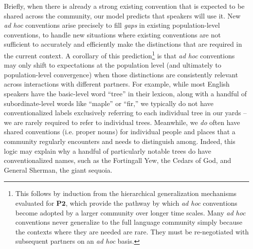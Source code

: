 Briefly, when there is already a strong existing convention that is expected to be shared across the community, our model predicts that speakers will use it. 
New \emph{ad hoc} conventions arise precisely to fill \emph{gaps} in existing population-level conventions, to handle new situations where existing conventions are not sufficient to accurately and efficiently make the distinctions that are required in the current context. 
A corollary of this prediction\footnote{This follows by induction from the hierarchical generalization mechanisms evaluated for $\textbf{P2}$, which provide the pathway by which \emph{ad hoc} conventions become adopted by a larger community over longer time scales. Many \emph{ad hoc} conventions never generalize to the full language community simply because the contexts where they are needed are rare. They must be re-negotiated with subsequent partners on an \emph{ad hoc} basis.} is that \emph{ad hoc} conventions may only shift to expectations at the population level (and ultimately to population-level convergence) when those distinctions are consistently relevant across interactions with different partners.
For example, while most English speakers have the basic-level word ``tree'' in their lexicon, along with a handful of subordinate-level words like ``maple'' or ``fir,'' we typically do not have conventionalized labels exclusively referring to each individual tree in our yards -- we are rarely required to refer to individual trees.
Meanwhile, we \emph{do} often have shared conventions (i.e. proper nouns) for individual people and places that a community regularly encounters and needs to distinguish among.
Indeed, this logic may explain why a handful of particularly notable trees do have conventionalized names, such as the Fortingall Yew, the Cedars of God, and General Sherman, the giant sequoia.

